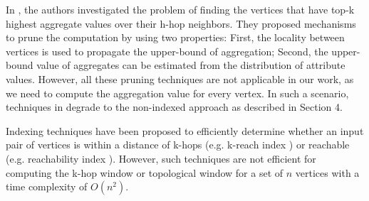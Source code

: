 In \cite{yan2010top}, the authors investigated the problem of finding the vertices that have top-k highest aggregate values over their h-hop neighbors. They proposed mechanisms to prune the computation by using two properties: First, the locality between vertices is used to propagate the upper-bound of aggregation; Second, the upper-bound value of aggregates can be estimated from the distribution of attribute values. However, all these pruning techniques are not applicable in our work, as we need to compute the aggregation value for every vertex. In such a scenario, techniques in \cite{yan2010top} degrade to the non-indexed approach as described in Section 4.


Indexing techniques have been proposed to efficiently determine whether an input pair of vertices is within a distance of k-hops (e.g. k-reach index \cite{cheng2012k}) or reachable (e.g. reachability index \cite{yu2010graph}). However, such techniques are not efficient for computing the k-hop window or topological window for a set of $n$ vertices with a time complexity of $O(n^2)$. 





